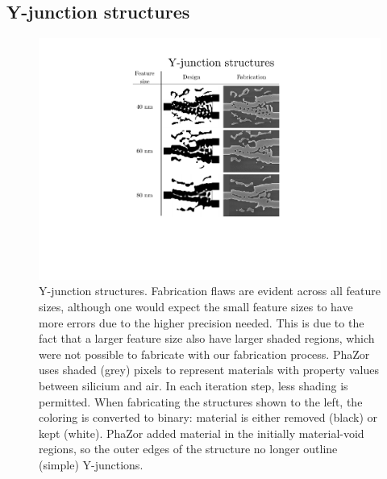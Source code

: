  \subsection{Y-junction structures}
 \begin{figure}[H]
    \centering
    \includegraphics[trim= 8.35cm 2.73cm 8.35cm 2.73cm,clip,width=\textwidth]{fig/yjunctionstructures.pdf}
        \vspace{-2cm}
    \caption{Y-junction structures. Fabrication flaws are evident across all feature sizes, although one would expect the small feature sizes to have more errors due to the higher precision needed. This is due to the fact that a larger feature size also have larger shaded regions, which were not possible to fabricate with our fabrication process. PhaZor uses shaded (grey) pixels to represent materials with property values between silicium and air. In each iteration step, less shading is permitted. When fabricating the structures shown to the left, the coloring is converted to binary: material is either removed (black) or kept (white). PhaZor added material in the initially material-void regions, so the outer edges of the structure no longer outline (simple) Y-junctions.}
    \label{fig:Y-juncStructures}
\end{figure}

 \newpage